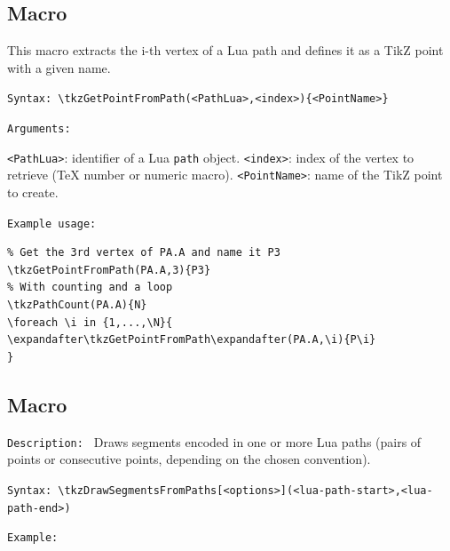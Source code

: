 



\subsection{Macro }
This macro extracts the i-th vertex of a Lua path and defines it as a TikZ point with a given name.

\texttt{Syntax: }\verb|\tkzGetPointFromPath(<PathLua>,<index>){<PointName>}|

\texttt{Arguments: }

\verb|<PathLua>|: identifier of a Lua \verb|path| object.
\verb|<index>|: index of the vertex to retrieve (TeX number or numeric macro).
\verb|<PointName>|: name of the TikZ point to create.
\medskip


\texttt{Example usage:}

\begin{mybox}
\begin{verbatim}
% Get the 3rd vertex of PA.A and name it P3
\tkzGetPointFromPath(PA.A,3){P3}
% With counting and a loop
\tkzPathCount(PA.A){N}
\foreach \i in {1,...,\N}{
\expandafter\tkzGetPointFromPath\expandafter(PA.A,\i){P\i}
}
\end{verbatim}
\end{mybox}




\subsection{Macro }
\label{sub:macro_tkzDrawSegmentsFromPaths}

\texttt{Description: }
Draws segments encoded in one or more Lua paths (pairs of points or consecutive
points, depending on the chosen convention).

\texttt{Syntax: }\verb|\tkzDrawSegmentsFromPaths[<options>](<lua-path-start>,<lua-path-end>)|

\texttt{Example: }

\begin{tkzexample}[vbox]

\begin{center}
 \end{center}
\end{tkzexample}

